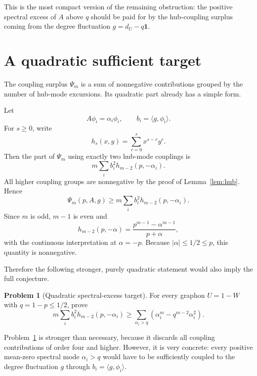 \documentclass[11pt]{article}
\theoremstyle{definition}
\newtheorem{problem}[theorem]{Problem}
\theoremstyle{remark}
\newcommand{\one}{\mathbf 1}
\newcommand{\ip}[2]{\langle #1,#2\rangle}
\begin{document}
This is the most compact version of the remaining obstruction: the positive spectral excess of $A$ above $q$ should be paid for by the hub-coupling surplus coming from the degree fluctuation $g=d_U-q\one$.

\section{A quadratic sufficient target}

The coupling surplus $\Psi_m$ is a sum of nonnegative contributions grouped by the number of hub-mode excursions.  Its quadratic part already has a simple form.

Let
\[
  A\phi_i=\alpha_i\phi_i,
  \qquad
  b_i=\ip{g}{\phi_i}.
\]
For $s\ge0$, write
\[
  h_s(x,y)=\sum_{r=0}^s x^{s-r}y^r.
\]
Then the part of $\Psi_m$ using exactly two hub-mode couplings is
\begin{equation}\label{eq:quadratic-coupling}
  m\sum_i b_i^2 h_{m-2}(p,-\alpha_i).
\end{equation}
All higher coupling groups are nonnegative by the proof of Lemma~\ref{lem:hub}.  Hence
\begin{equation}\label{eq:quadratic-lower-bound}
  \Psi_m(p,A,g)
  \ge
  m\sum_i b_i^2 h_{m-2}(p,-\alpha_i).
\end{equation}
Since $m$ is odd, $m-1$ is even and
\begin{equation}\label{eq:h-explicit}
  h_{m-2}(p,-\alpha)
  =
  \frac{p^{m-1}-\alpha^{m-1}}{p+\alpha},
\end{equation}
with the continuous interpretation at $\alpha=-p$.  Because $|\alpha|\le1/2\le p$, this quantity is nonnegative.

Therefore the following stronger, purely quadratic statement would also imply the full conjecture.

\begin{problem}[Quadratic spectral-excess target]\label{prob:quadratic-target}
For every graphon $U=1-W$ with $q=1-p\le1/2$, prove
\begin{equation}\label{eq:quadratic-target}
  m\sum_i b_i^2 h_{m-2}(p,-\alpha_i)
  \ge
  \sum_{\alpha_i>q}
  \left(\alpha_i^m-q^{m-2}\alpha_i^2\right).
\end{equation}
\end{problem}

Problem~\ref{prob:quadratic-target} is stronger than necessary, because it discards all coupling contributions of order four and higher.  However, it is very concrete: every positive mean-zero spectral mode $\alpha_i>q$ would have to be sufficiently coupled to the degree fluctuation $g$ through $b_i=\ip{g}{\phi_i}$.
\end{document}
